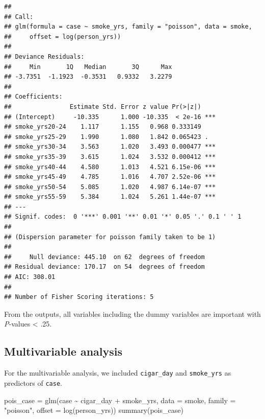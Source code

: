\documentclass[
  10pt,
]{krantz}
\newenvironment{Shaded}{\begin{snugshade}}{\end{snugshade}}
\newcommand{\AttributeTok}[1]{\textcolor[rgb]{0.77,0.63,0.00}{#1}}
\newcommand{\FunctionTok}[1]{\textcolor[rgb]{0.00,0.00,0.00}{#1}}
\newcommand{\NormalTok}[1]{#1}
\newcommand{\OtherTok}[1]{\textcolor[rgb]{0.56,0.35,0.01}{#1}}
\newcommand{\SpecialCharTok}[1]{\textcolor[rgb]{0.00,0.00,0.00}{#1}}
\newcommand{\StringTok}[1]{\textcolor[rgb]{0.31,0.60,0.02}{#1}}
\begin{document}
\begin{verbatim}
## 
## Call:
## glm(formula = case ~ smoke_yrs, family = "poisson", data = smoke, 
##     offset = log(person_yrs))
## 
## Deviance Residuals: 
##     Min       1Q   Median       3Q      Max  
## -3.7351  -1.1923  -0.3531   0.9332   3.2279  
## 
## Coefficients:
##                Estimate Std. Error z value Pr(>|z|)    
## (Intercept)     -10.335      1.000 -10.335  < 2e-16 ***
## smoke_yrs20-24    1.117      1.155   0.968 0.333149    
## smoke_yrs25-29    1.990      1.080   1.842 0.065423 .  
## smoke_yrs30-34    3.563      1.020   3.493 0.000477 ***
## smoke_yrs35-39    3.615      1.024   3.532 0.000412 ***
## smoke_yrs40-44    4.580      1.013   4.521 6.15e-06 ***
## smoke_yrs45-49    4.785      1.016   4.707 2.52e-06 ***
## smoke_yrs50-54    5.085      1.020   4.987 6.14e-07 ***
## smoke_yrs55-59    5.384      1.024   5.261 1.44e-07 ***
## ---
## Signif. codes:  0 '***' 0.001 '**' 0.01 '*' 0.05 '.' 0.1 ' ' 1
## 
## (Dispersion parameter for poisson family taken to be 1)
## 
##     Null deviance: 445.10  on 62  degrees of freedom
## Residual deviance: 170.17  on 54  degrees of freedom
## AIC: 308.01
## 
## Number of Fisher Scoring iterations: 5
\end{verbatim}

From the outputs, all variables including the dummy variables are important with \emph{P}-values \textless{} .25.

\hypertarget{multivariable-analysis-2}{%
\subsection{Multivariable analysis}\label{multivariable-analysis-2}}

For the multivariable analysis, we included \texttt{cigar\_day} and \texttt{smoke\_yrs} as predictors of \texttt{case}.

\begin{Shaded}
\begin{Highlighting}[]
\NormalTok{pois\_case }\OtherTok{=} \FunctionTok{glm}\NormalTok{(case }\SpecialCharTok{\textasciitilde{}}\NormalTok{ cigar\_day }\SpecialCharTok{+}\NormalTok{ smoke\_yrs, }\AttributeTok{data =}\NormalTok{ smoke, }
                \AttributeTok{family =} \StringTok{"poisson"}\NormalTok{, }\AttributeTok{offset =} \FunctionTok{log}\NormalTok{(person\_yrs))}
\FunctionTok{summary}\NormalTok{(pois\_case)}
\end{Highlighting}
\end{Shaded}
\end{document}
